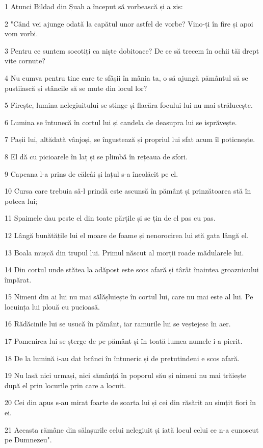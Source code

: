 \par 1 Atunci Bildad din Șuah a început să vorbească și a zis:
\par 2 "Când vei ajunge odată la capătul unor astfel de vorbe? Vino-ți în fire și apoi vom vorbi.
\par 3 Pentru ce suntem socotiți ca niște dobitoace? De ce să trecem în ochii tăi drept vite cornute?
\par 4 Nu cumva pentru tine care te sfâșii în mânia ta, o să ajungă pământul să se pustiiască și stâncile să se mute din locul lor?
\par 5 Firește, lumina nelegiuitului se stinge și flacăra focului lui nu mai strălucește.
\par 6 Lumina se întunecă în cortul lui și candela de deasupra lui se isprăvește.
\par 7 Pașii lui, altădată vânjoși, se îngustează și propriul lui sfat acum îl poticnește.
\par 8 El dă cu picioarele în laț și se plimbă în rețeaua de sfori.
\par 9 Capcana l-a prins de călcâi și lațul s-a încolăcit pe el.
\par 10 Cursa care trebuia să-l prindă este ascunsă în pământ și prinzătoarea stă în poteca lui;
\par 11 Spaimele dau peste el din toate părțile și se țin de el pas cu pas.
\par 12 Lângă bunătățile lui el moare de foame și nenorocirea lui stă gata lângă el.
\par 13 Boala mușcă din trupul lui. Primul născut al morții roade mădularele lui.
\par 14 Din cortul unde stătea la adăpost este scos afară și târât înaintea groaznicului împărat.
\par 15 Nimeni din ai lui nu mai sălășluiește în cortul lui, care nu mai este al lui. Pe locuința lui plouă cu pucioasă.
\par 16 Rădăcinile lui se usucă în pământ, iar ramurile lui se veștejesc în aer.
\par 17 Pomenirea lui se șterge de pe pământ și în toată lumea numele i-a pierit.
\par 18 De la lumină i-au dat brânci în întuneric și de pretutindeni e scos afară.
\par 19 Nu lasă nici urmași, nici sămânță în poporul său și nimeni nu mai trăiește după el prin locurile prin care a locuit.
\par 20 Cei din apus s-au mirat foarte de soarta lui și cei din răsărit au simțit fiori în ei.
\par 21 Aceasta rămâne din sălașurile celui nelegiuit și iată locul celui ce n-a cunoscut pe Dumnezeu".

